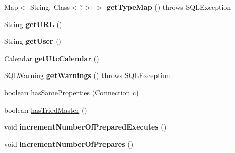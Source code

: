 \begin{DoxyCompactItemize}
Map$<$ String, Class$<$?$>$ $>$ {\bfseries get\+Type\+Map} ()  throws S\+Q\+L\+Exception 
\item 
\mbox{\label{classcom_1_1mysql_1_1jdbc_1_1_multi_host_my_s_q_l_connection_ad0271afddd4b3fb3a80b00cd5950e858}} 
String {\bfseries get\+U\+RL} ()
\item 
\mbox{\label{classcom_1_1mysql_1_1jdbc_1_1_multi_host_my_s_q_l_connection_ad6f404a2482e2cc334dcae686cf9bdf9}} 
String {\bfseries get\+User} ()
\item 
\mbox{\label{classcom_1_1mysql_1_1jdbc_1_1_multi_host_my_s_q_l_connection_a57c13ebefeca2cf2a733166b861f5a80}} 
Calendar {\bfseries get\+Utc\+Calendar} ()
\item 
\mbox{\label{classcom_1_1mysql_1_1jdbc_1_1_multi_host_my_s_q_l_connection_a5ef9bba702e2fabd55046cd77c3b6d98}} 
S\+Q\+L\+Warning {\bfseries get\+Warnings} ()  throws S\+Q\+L\+Exception 
\item 
boolean \mbox{\hyperlink{classcom_1_1mysql_1_1jdbc_1_1_multi_host_my_s_q_l_connection_a6d1ba78a6ad110ec1027fa341ceef1e5}{has\+Same\+Properties}} (\mbox{\hyperlink{interfacecom_1_1mysql_1_1jdbc_1_1_connection}{Connection}} c)
\item 
boolean \mbox{\hyperlink{classcom_1_1mysql_1_1jdbc_1_1_multi_host_my_s_q_l_connection_a0c6bc4351473d95ef46999773702ed18}{has\+Tried\+Master}} ()
\item 
\mbox{\label{classcom_1_1mysql_1_1jdbc_1_1_multi_host_my_s_q_l_connection_af06f29d9ebf4a4257eebc236b03e1d92}} 
void {\bfseries increment\+Number\+Of\+Prepared\+Executes} ()
\item 
\mbox{\label{classcom_1_1mysql_1_1jdbc_1_1_multi_host_my_s_q_l_connection_a2658c53c478c8750aa2a7d5cd84ec611}} 
void {\bfseries increment\+Number\+Of\+Prepares} ()
\item 
\mbox{\label{classcom_1_1mysql_1_1jdbc_1_1_multi_host_my_s_q_l_connection_a68bdbbcb9e7989ff3f05655ebfa99f0e}} 

\end{DoxyCompactItemize}
